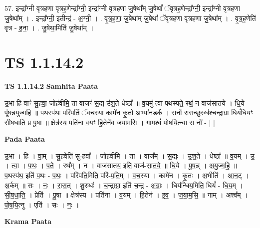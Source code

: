 \documentclass[17pt]{extarticle}
\begin{document}
57. इन्द्रा᳚ग्नी वृत्रहणा वृत्रह॒णेन्द्रा᳚ग्नी॒ इन्द्रा᳚ग्नी वृत्रहणा जु॒षेथा᳚म् जु॒षेथां᳚ ॅवृत्रह॒णेन्द्रा᳚ग्नी॒ इन्द्रा᳚ग्नी वृत्रहणा जु॒षेथा᳚म् । . इन्द्रा᳚ग्नी॒ इतीन्द्र॑ - अ॒ग्नी॒ । . वृ॒त्र॒ह॒णा॒ जु॒षेथा᳚म् जु॒षेथां᳚ ॅवृत्रहणा वृत्रहणा जु॒षेथा᳚म् । . वृ॒त्र॒ह॒णेति॑ वृत्र - ह॒ना॒ । . जु॒षेथा॒मिति॑ जु॒षेथा᳚म् । \newline
\pagebreak
{}
\section*{ TS 1.1.14.2 }

\textbf{TS 1.1.14.2 } \newline
\textbf{Samhita Paata} \newline

उ॒भा हि वाꣳ॑ सु॒हवा॒ जोह॑वीमि॒ ता वाजꣳ॑ स॒द्य उ॑श॒ते धेष्ठा᳚ ॥ व॒यमु॑ त्वा पथस्पते॒ रथं॒ न वाज॑सातये । धि॒ये पू॑षन्नयुज्महि ॥ प॒थस्प॑थः॒ परि॑पतिं ॅवच॒स्या कामे॑न कृ॒तो अ॒भ्या॑नड॒र्कं । सनो॑ रासच्छु॒रुध॑श्च॒न्द्राग्रा॒ धियं॑धियꣳ सीषधाति॒ प्र पू॒षा ॥ क्षेत्र॑स्य॒ पति॑ना व॒यꣳ हि॒तेने॑व जयामसि । गामश्वं॑ पोषयि॒त्न्वा स नो॑ - [ ] \newline

\textbf{Pada Paata} \newline

उ॒भा । हि । वा॒म् । सु॒हवेति॑ सु-हवा᳚ । जोह॑वीमि । ता । वाज᳚म् । स॒द्यः । उ॒श॒ते । धेष्ठा᳚ ॥ व॒यम् । उ॒ । त्वा॒ । प॒थः॒ । प॒ते॒ । रथ᳚म् । न । वाज॑सातय॒ इति॒ वाज॑-सा॒त॒ये॒ ॥ धि॒ये । पू॒ष॒न्न् । अ॒यु॒ज्म॒हि॒ ॥ प॒थस्प॑थ॒ इति॑ प॒थः - प॒थः॒ । परि॑पति॒मिति॒ परि॑-प॒ति॒म् । व॒च॒स्या । कामे॑न । कृ॒तः । अ॒भीति॑ । आ॒न॒ट् । अ॒र्कम् ॥ सः । नः॒ । रा॒स॒त् । शु॒रुधः॑ । च॒न्द्राग्रा॒ इति॑ च॒न्द्र - अ॒ग्राः॒ । धिय॑न्धिय॒मिति॒ धियं᳚ - धि॒य॒म् । सी॒ष॒धा॒ति॒ । प्रेति॑ । पू॒षा ॥ क्षेत्र॑स्य । पति॑ना । व॒यम् । हि॒तेन॑ । इ॒व॒ । ज॒या॒म॒सि॒ ॥ गाम् । अश्व᳚म् । पो॒ष॒यि॒त्नु । एति॑ । सः । नः॒ ।  \newline


\textbf{Krama Paata} \newline
\end{document}
